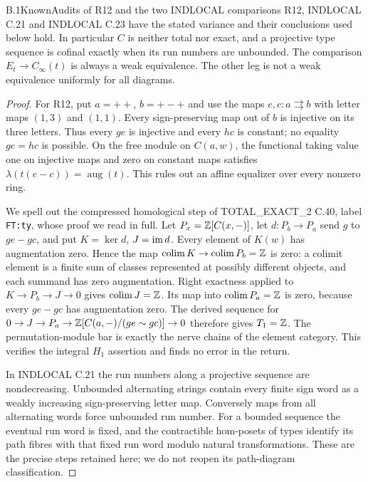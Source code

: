 \begin{claim}{B.1}{Known}{Audits of R12 and the two INDLOCAL comparisons}
\label{B:audits}
R12, INDLOCAL C.21 and INDLOCAL C.23 have the stated variance and
their conclusions used below hold. In particular $C$ is neither
total nor exact, and a projective type sequence is cofinal exactly
when its run numbers are unbounded. The comparison
$E_t\to C_\infty(t)$ is always a weak equivalence. The other leg
is not a weak equivalence uniformly for all diagrams.
\end{claim}
\begin{proof}
For R12, put $a=++$, $b=+-+$ and use the maps
$e,c:a\rightrightarrows b$ with letter maps $(1,3)$ and $(1,1)$.
Every sign-preserving map out of $b$ is injective on its three
letters. Thus every $ge$ is injective and every $hc$ is constant;
no equality $ge=hc$ is possible. On the free module on $C(a,w)$,
the functional taking value one on injective maps and zero on
constant maps satisfies
$\lambda(t(e-c))=\operatorname{aug}(t)$.
This rules out an affine equalizer over every nonzero ring.

We spell out the compressed homological step of TOTAL\_EXACT\_2
C.40, label \texttt{FT:ty}, whose proof we read in full. Let
$P_x=\mathbb Z[C(x,-)]$, let $d:P_b\to P_a$ send $g$ to $ge-gc$,
and put $K=\ker d$, $J=\operatorname{im} d$. Every element of $K(w)$ has
augmentation zero. Hence the map
$\operatorname*{colim} K\to\operatorname*{colim} P_b=\mathbb Z$ is zero: a colimit element is a
finite sum of classes represented at possibly different objects,
and each summand has zero augmentation. Right exactness applied
to $K\to P_b\to J\to0$ gives $\operatorname*{colim} J=\mathbb Z$. Its map into
$\operatorname*{colim} P_a=\mathbb Z$ is zero, because every $ge-gc$ has augmentation
zero. The derived sequence for
$0\to J\to P_a\to\mathbb Z[C(a,-)/(ge\sim gc)]\to0$
therefore gives $T_1=\mathbb Z$. The permutation-module bar is exactly
the nerve chains of the element category. This verifies the
integral $H_1$ assertion and finds no error in the return.

In INDLOCAL C.21 the run numbers along a projective sequence are
nondecreasing. Unbounded alternating strings contain every finite
sign word as a weakly increasing sign-preserving letter map.
Conversely maps from all alternating words force unbounded run
number. For a bounded sequence the eventual run word is fixed,
and the contractible hom-posets of types identify its path fibres
with that fixed run word modulo natural transformations. These are
the precise steps retained here; we do not reopen its path-diagram
classification.


\end{proof}
